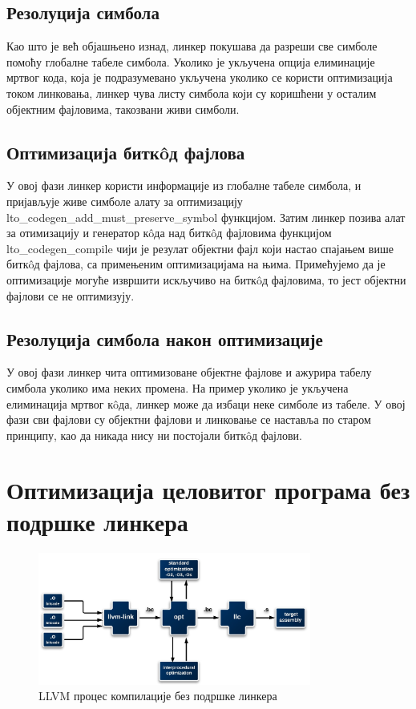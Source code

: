 \documentclass[12pt,oneside]{memoir}
\begin{document}
\subsection{Резолуција симбола}
Као што је већ објашњено изнад, линкер покушава да разреши све симболе помоћу
глобалне табеле симбола.
Уколико је укључена опција елиминације мртвог кода, која је подразумевано укључена
уколико се користи оптимизација током линковања, линкер чува листу симбола који
су коришћени у осталим објектним фајловима, такозвани живи симболи.

\subsection{Оптимизација битк\^{o}д фајлова} 
У овој фази линкер користи информације из глобалне табеле симбола, и пријављује
живе симболе алату за оптимизацију
lto{\_}codegen{\_}add{\_}must{\_}preserve{\_}symbol функцијом.
Затим линкер позива алат за отимизацију и генератор к\^{o}да над битк\^{o}д фајловима
функцијом lto{\_}codegen{\_}compile чији је резулат објектни фајл
који настао спајањем више битк\^{o}д фајлова, са примењеним оптимизацијама на њима.
Примећујемо да је оптимизације могуће извршити искључиво на битк\^{o}д фајловима,
то јест објектни фајлови се не оптимизују.

\subsection{Резолуција симбола након оптимизације}
У овој фази линкер чита оптимизоване објектне фајлове и ажурира табелу симбола уколико 
има неких промена. На пример уколико је укључена елиминација мртвог к\^{o}да,
линкер може да избаци неке симболе из табеле.
У овој фази сви фајлови су објектни фајлови и линковање се наставља
по старом принципу, као да никада нису ни постојали битк\^{o}д фајлови.

\section{Оптимизација целовитог програма без подршке линкера}
\begin{figure}[!ht]
  \centering
  \includegraphics[width=0.8\textwidth]{llvm_link.png}
  \caption{LLVM процес компилације без подршке линкера}
  \label{fig:grafikon}
\end{figure}
\end{document}
